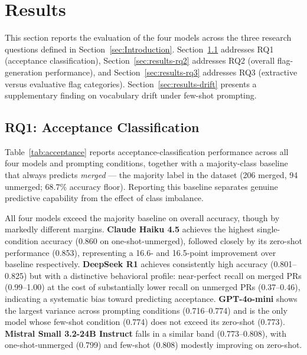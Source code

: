 
\section{Results}\label{sec:Results}

This section reports the evaluation of the four models across the
three research questions defined in Section~\ref{sec:Introduction}.
Section~\ref{sec:results-rq1} addresses RQ1 (acceptance
classification), Section~\ref{sec:results-rq2} addresses RQ2 (overall
flag-generation performance), and Section~\ref{sec:results-rq3}
addresses RQ3 (extractive versus evaluative flag categories).
Section~\ref{sec:results-drift} presents a supplementary finding on
vocabulary drift under few-shot prompting.

\subsection{RQ1: Acceptance Classification}\label{sec:results-rq1}

Table~\ref{tab:acceptance} reports acceptance-classification
performance across all four models and prompting conditions, together
with a majority-class baseline that always predicts \emph{merged} ---
the majority label in the dataset (206 merged, 94 unmerged; 68.7\%
accuracy floor).  Reporting this baseline separates genuine predictive
capability from the effect of class imbalance.


All four models exceed the majority baseline on overall accuracy,
though by markedly different margins.  \textbf{Claude Haiku 4.5}
achieves the highest single-condition accuracy (0.860 on
one-shot-unmerged), followed closely by its zero-shot performance
(0.853), representing a 16.6- and 16.5-point improvement over baseline
respectively.  \textbf{DeepSeek R1} achieves consistently high
accuracy (0.801--0.825) but with a distinctive behavioral profile:
near-perfect recall on merged PRs (0.99--1.00) at the cost of
substantially lower recall on unmerged PRs (0.37--0.46), indicating a
systematic bias toward predicting acceptance.  \textbf{GPT-4o-mini}
shows the largest variance across prompting conditions (0.716--0.774)
and is the only model whose few-shot condition (0.774) does not exceed
its zero-shot (0.773).  \textbf{Mistral Small 3.2-24B Instruct} falls
in a similar band (0.773--0.808), with one-shot-unmerged (0.799) and
few-shot (0.808) modestly improving on zero-shot.

